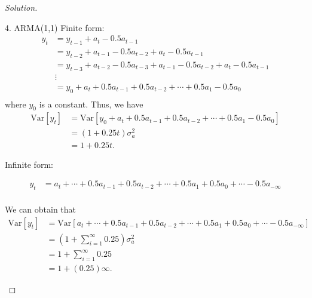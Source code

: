 \documentclass[UTF8,a4paper,14pt]{ctexart}
\newcommand{\Var}{\mathrm{Var}}
\newenvironment{solution}
  {\renewcommand\qedsymbol{$\blacksquare$}\begin{proof}[Solution]}
  {\end{proof}}
\theoremstyle{definition}
\theoremstyle{remark}
\begin{document}
\begin{solution}
\begin{mybox}{4. ARMA(1,1)}
    Finite form:
    \begin{equation}
      \begin{aligned}
        y_t &=  y_{t-1}+a_t -0.5a_{t-1} \\
        &=y_{t-2}+a_{t-1}-0.5a_{t-2}+a_t -0.5a_{t-1}\\
        &=y_{t-3}+a_{t-2}-0.5a_{t-3} +a_{t-1}-0.5a_{t-2}+a_t -0.5a_{t-1}\\
        &
        \vdots\\
        &=y_0 +a_t+0.5a_{t-1}+0.5a_{t-2}+\cdots+0.5a_{1}-0.5a_{0}\\
      \end{aligned}
    \end{equation}
    where \(y_0\) is a constant.
    Thus, we have
    \begin{equation}
      \begin{aligned}
        \Var[y_t] &= \Var[y_0 +a_t+0.5a_{t-1}+0.5a_{t-2}+\cdots+0.5a_{1}-0.5a_{0}]\\ 
        &=(1+0.25t)\sigma_a^2\\
        &=1+0.25t.
      \end{aligned}
    \end{equation}

    Infinite form:

    \begin{equation}
      \begin{aligned}
        y_t 
        &=a_{t}+\cdots+0.5a_{t-1}+0.5a_{t-2}+\cdots+0.5a_{1}+0.5a_{0}+\cdots-0.5a_{-\infty}\\
      \end{aligned}
    \end{equation}
    
    We can obtain that
    \begin{equation}
      \begin{aligned}
        \Var[y_t] &= \Var[a_{t}+\cdots+0.5a_{t-1}+0.5a_{t-2}+\cdots+0.5a_{1}+0.5a_{0}+\cdots-0.5a_{-\infty}]\\ 
        &=(1+\sum_{i = 1}^{\infty} 0.25 )\sigma_a^2\\
        &=1+\sum_{i = 1}^{\infty} 0.25 \\
        &=1+ (0.25)\infty.
      \end{aligned}
    \end{equation}


    
  \end{mybox}
\end{solution}
\end{document}
